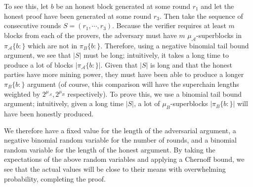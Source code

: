To see this, let $b$ be an honest block generated at some round $r_1$ and let
the honest proof have been generated at some round $r_3$. Then take the sequence
of consecutive rounds $S = (r_1, \cdots, r_3)$. Because the verifier requires at
least $m$ blocks from each of the provers, the adversary must have $m$
$\mu_\mathcal{A}$-superblocks in $\pi_\mathcal{A}\{b:\}$ which are not in
$\pi_B\{b:\}$. Therefore, using a negative binomial tail bound argument, we see
that $|S|$ must be long; intuitively, it takes a long time to produce a lot of
blocks $|\pi_\mathcal{A}\{b:\}|$. Given that $|S|$ is long and that the honest
parties have more mining power, they must have been able to produce a longer
$\pi_B\{b:\}$ argument (of course, this comparison will have the superchain
lengths weighted by $2^{\mu_\mathcal{A}}, 2^{\mu_B}$ respectively). To prove
this, we use a binomial tail bound argument; intuitively, given a long time
$|S|$, a lot of $\mu_B$-superblocks $|\pi_B\{b:\}|$ will have been honestly
produced.

We therefore have a fixed value for the length of the adversarial argument, a
negative binomial random variable for the number of rounds, and a binomial
random variable for the length of the honest argument. By taking the
expectations of the above random variables and applying a Chernoff bound, we see
that the actual values will be close to their means with overwhelming
probability, completing the proof.

%
%
%

